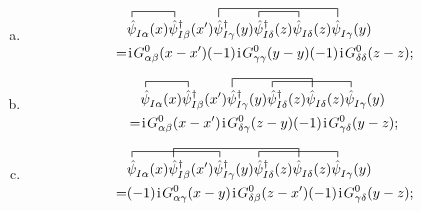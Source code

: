 \begin{enumerate}[(a)]
\item 
\begin{align}
&
\contraction[1ex]{}{\hat{\psi}}{^{}_{I \alpha}(x)}{\hat{\psi}}
\contraction[1.5ex]{\hat{\psi}^{}_{I \alpha}(x)\hat{\psi}_{I \beta}^{\dagger}(x^{\prime})}
{\hat{\psi}}
{_{I \gamma}^{\dagger}(y)\hat{\psi}_{I \delta}^{\dagger}(z)\hat{\psi}^{}_{I \delta}(z)}
{\hat{\psi}}
\contraction[1ex]{\hat{\psi}^{}_{I \alpha}(x)\hat{\psi}_{I \beta}^{\dagger}(x^{\prime})\hat{\psi}_{I \gamma}^{\dagger}(y)}{\hat{\psi}}{_{I \delta}^{\dagger}(z)}{\hat{\psi}}
\hat{\psi}^{}_{I \alpha}(x)
\hat{\psi}_{I \beta}^{\dagger}(x^{\prime})
\hat{\psi}_{I \gamma}^{\dagger}(y)
\hat{\psi}_{I \delta}^{\dagger}(z)
\hat{\psi}^{}_{I \delta}(z)
\hat{\psi}^{}_{I \gamma}(y)\nonumber\\
=&\ii G_{\alpha\beta}^{0}(x-x')(-1)\ii G_{\gamma\gamma}^{0}(y-y)(-1)\ii G_{\delta\delta}^{0}(z-z);
\end{align}

\item 
\begin{align}
&
\contraction[1ex]{}
{\hat{\psi}}
{^{}_{I \alpha}(x)}
{\hat{\psi}}
\contraction[1.5ex]{\hat{\psi}^{}_{I \alpha}(x)\hat{\psi}_{I \beta}^{\dagger}(x^{\prime})}
{\hat{\psi}}
{_{I \gamma}^{\dagger}(y)\hat{\psi}_{I \delta}^{\dagger}(z)}
{\hat{\psi}}
\contraction[1ex]{\hat{\psi}^{}_{I \alpha}(x)\hat{\psi}_{I \beta}^{\dagger}(x^{\prime})\hat{\psi}_{I \gamma}^{\dagger}(y)}
{\hat{\psi}}
{_{I \delta}^{\dagger}(z)\hat{\psi}^{}_{I \delta}(z)}
{\hat{\psi}}
\hat{\psi}^{}_{I \alpha}(x)
\hat{\psi}_{I \beta}^{\dagger}(x^{\prime})
\hat{\psi}_{I \gamma}^{\dagger}(y)
\hat{\psi}_{I \delta}^{\dagger}(z)
\hat{\psi}^{}_{I \delta}(z)
\hat{\psi}^{}_{I \gamma}(y)\nonumber\\
=&\ii G_{\alpha\beta}^{0}(x-x')\ii G_{\delta\gamma}^{0}(z-y)(-1)\ii G_{\gamma\delta}^{0}(y-z);
\end{align}

\item 
\begin{align}
&\contraction[1ex]{}
{\hat{\psi}}
{^{}_{I \alpha}(x)\hat{\psi}_{I \beta}^{\dagger}(x^{\prime})}
{\hat{\psi}}
\contraction[1.5ex]{\hat{\psi}^{}_{I \alpha}(x)}
{\hat{\psi}}
{_{I \beta}^{\dagger}(x^{\prime})\hat{\psi}_{I \gamma}^{\dagger}(y)
\hat{\psi}_{I \delta}^{\dagger}(z)}
{\hat{\psi}}
\contraction[1ex]{\hat{\psi}^{}_{I \alpha}(x)
\hat{\psi}_{I \beta}^{\dagger}(x^{\prime})
\hat{\psi}_{I \gamma}^{\dagger}(y)}
{\hat{\psi}}
{_{I \delta}^{\dagger}(z)\hat{\psi}^{}_{I \delta}(z)}
{\hat{\psi}}
\hat{\psi}^{}_{I \alpha}(x)
\hat{\psi}_{I \beta}^{\dagger}(x^{\prime})
\hat{\psi}_{I \gamma}^{\dagger}(y)
\hat{\psi}_{I \delta}^{\dagger}(z)
\hat{\psi}^{}_{I \delta}(z)
\hat{\psi}^{}_{I \gamma}(y)\nonumber\\
=&(-1)\ii G_{\alpha\gamma}^{0}(x-y)\ii G_{\delta\beta}^{0}(z-x')(-1)\ii G_{\gamma\delta}^{0}(y-z);
\end{align}


\end{enumerate}
